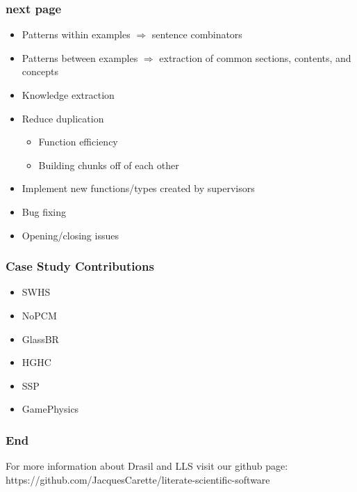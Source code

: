 \documentclass{beamer}
\begin{document}
\begin{frame}
\frametitle{next page}
\begin{itemize}
 \item<1-> Patterns within examples $\Rightarrow$ sentence combinators
 \item<2-> Patterns between examples $\Rightarrow$ extraction of common sections, contents, and concepts
 \item<3-> Knowledge extraction
 \item<4-> Reduce duplication
   \begin{itemize}
     \item Function efficiency
     \item Building chunks off of each other
   \end{itemize}
 \item<5-> Implement new functions/types created by supervisors
 \item<6-> Bug fixing
 \item<7-> Opening/closing issues
\end{itemize}
\end{frame}

\begin{frame}
\frametitle{Case Study Contributions}
\begin{itemize}
\item SWHS
\item NoPCM
\item GlassBR
\item HGHC
\item SSP
\item GamePhysics
\end{itemize}
\end{frame}

\begin{frame}
\frametitle{End}
For more information about Drasil and LLS visit our github page: \\
https://github.com/JacquesCarette/literate-scientific-software
\end{frame}
\end{document}
